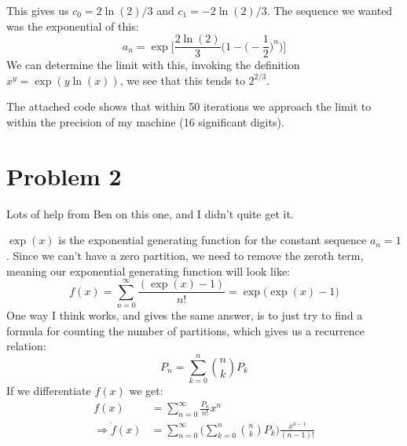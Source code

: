\documentclass{article}
\begin{document}
        This gives us $c_{0}=2\ln(2)/3$ and
        $c_{1}=-2\ln(2)/3$. The sequence we wanted was the
        exponential of this:
        \begin{equation}
            a_{n}=\exp\Big[
                \frac{2\ln(2)}{3}\Big(
                    1-\big(-\frac{1}{2}\big)^{n}
                \Big)
            \Big]
        \end{equation}
        We can determine the limit with this, invoking
        the definition $x^{y}=\exp(y\ln(x))$, we see that
        this tends to $2^{2/3}$.
        \par\hfill\par
        The attached code shows that within 50 iterations we
        approach the limit to within the precision of my machine
        (16 significant digits).
    \section*{Problem 2}
        Lots of help from Ben on this one, and I didn't quite get
        it.
        \par\hfill\par
        $\exp(x)$ is the exponential generating function for the
        constant sequence $a_{n}=1$. Since we can't have a
        zero partition, we need to remove the zeroth term, meaning
        our exponential generating function will look like:
        \begin{equation}
            f(x)=\sum_{n=0}^{\infty}\frac{(\exp(x)-1)}{n!}
                =\exp\big(\exp(x)-1\big)
        \end{equation}
        One way I think works, and gives the same answer, is to
        just try to find a formula for counting the number of
        partitions, which gives us a recurrence relation:
        \begin{equation}
            P_{n}=\sum_{k=0}^{n}\binom{n}{k}P_{k}
        \end{equation}
        If we differentiate $f(x)$ we get:
        \begin{subequations}
            \begin{align}
                f(x)&=\sum_{n=0}^{\infty}\frac{P_{n}}{n!}x^{n}\\
                \Rightarrow
                \dot{f}(x)&=\sum_{n=0}^{\infty}\Big(
                        \sum_{k=0}^{n}\binom{n}{k}P_{k}
                    \Big)\frac{x^{n-1}}{(n-1)!}
            \end{align}
        \end{subequations}
\end{document}
